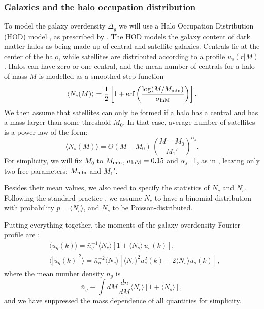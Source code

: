\documentclass[useAMS,usenatbib]{mn2e}
\begin{document}
    \subsubsection{Galaxies and the halo occupation distribution}\label{sssec:theory.hm.hod}
      To model the galaxy overdensity $\Delta_g$ we will use a Halo Occupation Distribution (HOD) model \citep{2002ApJ...575..587B,2005ApJ...633..791Z,2013MNRAS.430..725V}, as prescribed by \cite{2011ApJ...736...59Z}. The HOD models the galaxy content of dark matter halos as being made up of central and satellite galaxies. Centrals lie at the center of the halo, while satellites are distributed according to a profile $u_s(r|M)$. Halos can have zero or one central, and the mean number of centrals for a halo of mass $M$ is modelled as a smoothed step function
      \begin{equation}
        \langle N_c(M)\rangle=\frac{1}{2}\left[1+{\rm erf}\left(\frac{\log(M/M_{\rm min})}{\sigma_{\rm lnM}}\right)\right].
      \end{equation}
      We then assume that satellites can only be formed if a halo has a central and has a mass larger than some threshold $M_0$. In that case, average number of satellites is a power law of the form:
      \begin{equation}
        \langle N_s(M)\rangle=\Theta(M-M_0)\,\left(\frac{M-M_0}{M_1'}\right)^{\alpha_s}.
      \end{equation}
      For simplicity, we will fix $M_0$ to $M_{\rm min}$, $\sigma_{\rm lnM}=0.15$ and $\alpha_s$=1, as in \cite{2018MNRAS.473.4318A}, leaving only two free parameters: $M_{\rm min}$ and $M_1'$.
      
      Besides their mean values, we also need to specify the statistics of $N_c$ and $N_s$. Following the standard practice \citep{2013MNRAS.430..725V}, we assume $N_c$ to have a binomial distribution with probability $p=\langle N_c\rangle$, and $N_s$ to be Poisson-distributed.

      Putting everything together, the moments of the galaxy overdensity Fourier profile are \cite{2013MNRAS.430..725V}:
      \begin{align}
        &\langle u_g(k)\rangle=\bar{n}_g^{-1}\langle N_c\rangle\left[1+\langle N_s\rangle\,u_s(k)\right],\\
        &\langle |u_g(k)|^2\rangle=\bar{n}_g^{-2}\langle N_c\rangle\left[\langle N_s\rangle^2u_s^2(k)+2\langle N_s\rangle u_s(k)\right],
      \end{align}
      where the mean number density $\bar{n}_g$ is
      \begin{equation}
        \bar{n}_g\equiv\int dM\,\frac{dn}{dM}\langle N_c\rangle\left[1+\langle N_s\rangle\right],
      \end{equation} 
      and we have suppressed the mass dependence of all quantities for simplicity.
\end{document}
